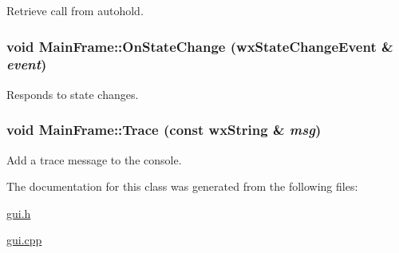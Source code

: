 Retrieve call from autohold. 

\hypertarget{classMainFrame_5f4f33d38822481ad0608334a798325f}{
\subsubsection[{OnStateChange}]{\setlength{\rightskip}{0pt plus 5cm}void MainFrame::OnStateChange ({\bf wxStateChangeEvent} \& {\em event})}}
\label{classMainFrame_5f4f33d38822481ad0608334a798325f}


Responds to state changes. 

\hypertarget{classMainFrame_f32b38c49c7276b789284ed9ee92a0c5}{
\subsubsection[{Trace}]{\setlength{\rightskip}{0pt plus 5cm}void MainFrame::Trace (const wxString \& {\em msg})}}
\label{classMainFrame_f32b38c49c7276b789284ed9ee92a0c5}


Add a trace message to the console. 



The documentation for this class was generated from the following files:\begin{CompactItemize}
\item 
\hyperlink{gui_8h}{gui.h}\item 
\hyperlink{gui_8cpp}{gui.cpp}\end{CompactItemize}
